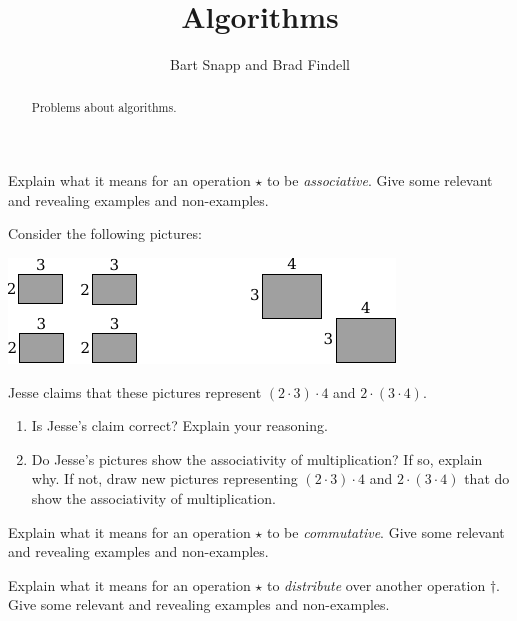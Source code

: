 \documentclass[nooutcomes]{ximera}
\title{Algorithms}
\author{Bart Snapp and Brad Findell}
\begin{document}
\begin{abstract}
Problems about algorithms. 
\end{abstract}
\maketitle



\begin{problem}Explain what it means for an operation $\star$ to be
  \textit{associative}. Give some relevant and revealing examples and non-examples.
\end{problem} 

\begin{problem}\label{P:MA}Consider the following pictures:
\begin{image}
\includegraphics{assMult.pdf}
\end{image}
Jesse claims that these pictures represent $(2\cdot 3)\cdot 4$ and
$2\cdot (3\cdot 4)$.
\begin{enumerate}
\item Is Jesse's claim correct? Explain your reasoning.
\item Do Jesse's pictures show the associativity of multiplication? If
  so, explain why. If not, draw new pictures representing $(2\cdot
  3)\cdot 4$ and $2\cdot (3\cdot 4)$ that do show the associativity
  of multiplication.
\end{enumerate}
\end{problem} 

\begin{problem}Explain what it means for an operation $\star$ to be
  \textit{commutative}. Give some relevant and revealing examples  and non-examples.
\end{problem} 

\begin{problem}Explain what it means for an operation $\star$ to \textit{distribute}
  over another operation $\dagger$. Give some relevant and revealing
  examples and non-examples.
\end{problem} 
\end{document}
